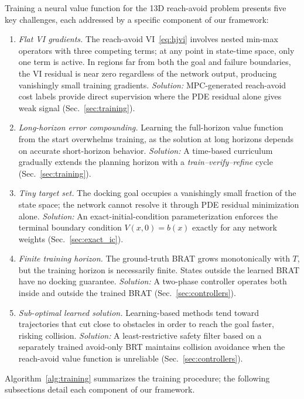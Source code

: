 \documentclass[letterpaper, 10 pt, conference]{ieeeconf}
\begin{document}
Training a neural value function for the 13D reach-avoid problem presents five key challenges, each addressed by a specific component of our framework:
\begin{enumerate}
\item \emph{Flat VI gradients.} The reach-avoid VI~\eqref{eq:hjvi} involves nested min-max operators with three competing terms; at any point in state-time space, only one term is active. In regions far from both the goal and failure boundaries, the VI residual is near zero regardless of the network output, producing vanishingly small training gradients. \emph{Solution:} MPC-generated reach-avoid cost labels provide direct supervision where the PDE residual alone gives weak signal (Sec.~\ref{sec:training}).

\item \emph{Long-horizon error compounding.} Learning the full-horizon value function from the start overwhelms training, as the solution at long horizons depends on accurate short-horizon behavior. \emph{Solution:} A time-based curriculum gradually extends the planning horizon with a \emph{train--verify--refine} cycle (Sec.~\ref{sec:training}).

\item \emph{Tiny target set.} The docking goal occupies a vanishingly small fraction of the state space; the network cannot resolve it through PDE residual minimization alone. \emph{Solution:} An exact-initial-condition parameterization enforces the terminal boundary condition $V(x,0) = b(x)$ exactly for any network weights (Sec.~\ref{sec:exact_ic}).

\item \emph{Finite training horizon.} The ground-truth BRAT grows monotonically with $T$, but the training horizon is necessarily finite. States outside the learned BRAT have no docking guarantee. \emph{Solution:} A two-phase controller operates both inside and outside the trained BRAT (Sec.~\ref{sec:controllers}).

\item \emph{Sub-optimal learned solution.} Learning-based methods tend toward trajectories that cut close to obstacles in order to reach the goal faster, risking collision. \emph{Solution:} A least-restrictive safety filter based on a separately trained avoid-only BRT maintains collision avoidance when the reach-avoid value function is unreliable (Sec.~\ref{sec:controllers}).
\end{enumerate}

\noindent Algorithm~\ref{alg:training} summarizes the training procedure; the following subsections detail each component of our framework.
\end{document}
